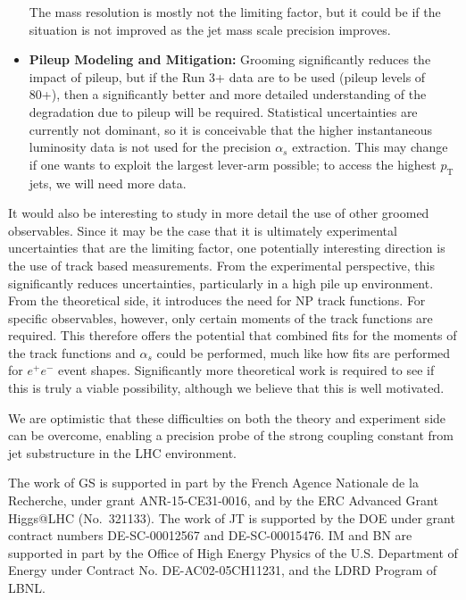 \documentclass[11pt,letterpaper]{article}
\begin{document}
\begin{itemize}
%
The mass resolution is mostly not the limiting factor, but it could be if the situation is not improved as the jet mass scale precision improves.
%
\item {\bf Pileup Modeling and Mitigation:} Grooming significantly reduces the impact of pileup, but if the Run 3+ data are to be used (pileup levels of 80+), then a significantly better and more detailed understanding of the degradation due to pileup will be required.
%
Statistical uncertainties are currently not dominant, so it is conceivable that the higher instantaneous luminosity data is not used for the precision $\alpha_s$ extraction.
%
This may change if one wants to exploit the largest lever-arm possible; to access the highest $p_\text{T}$ jets, we will need more data.
%
\end{itemize}

It would also be interesting to study in more detail the use of other groomed observables.
%
Since it may be the case that it is ultimately experimental uncertainties that are the limiting factor, one potentially interesting direction is the use of track based measurements.
%
From the experimental perspective, this significantly reduces uncertainties, particularly in a high pile up environment.
%
From the theoretical side, it introduces the need for NP track functions.
%
For specific observables, however, only certain moments of the track functions are required.
%
This therefore offers the potential that combined fits for the moments of the track functions and $\alpha_s$ could be performed, much like how fits are performed for $e^+e^-$ event shapes.
%
Significantly more theoretical work is required to see if this is truly a viable possibility, although we believe that this is well motivated.

We are optimistic that these difficulties on both the theory and experiment side can be overcome, enabling a precision probe of the strong coupling constant from jet substructure in the LHC environment.

\begin{acknowledgments}

The work of GS is supported in part by the French Agence Nationale de la Recherche,
under grant ANR-15-CE31-0016, and by the ERC Advanced Grant Higgs@LHC
(No.\ 321133).
%
The work of JT is supported by the DOE under grant contract numbers DE-SC-00012567 and DE-SC-00015476.
%
IM and BN are supported in part by the Office of High Energy Physics of the U.S. Department of Energy under Contract No. DE-AC02-05CH11231, and the LDRD Program of LBNL.

\end{acknowledgments}



\end{document}
